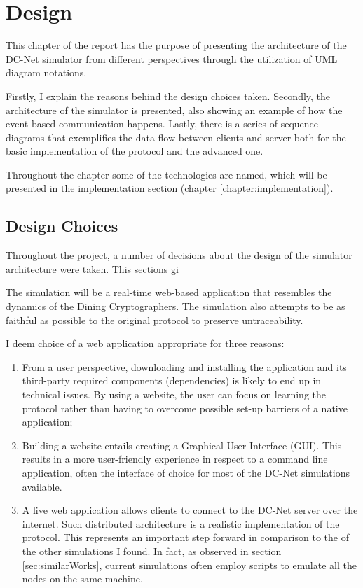 \chapter{Design} \label{chapter:design}
This chapter of the report has the purpose of presenting the architecture of the DC-Net simulator from different perspectives through the utilization of UML diagram notations.

Firstly, I explain the reasons behind the design choices taken. Secondly, the architecture of the simulator is presented, also showing an example of how the event-based communication happens. Lastly, there is a series of sequence diagrams that exemplifies the data flow between clients and server both for the basic implementation of the protocol and the advanced one. \newline

Throughout the chapter some of the technologies are named, which will be presented in the implementation section (chapter \ref{chapter:implementation}).


\section{Design Choices}
Throughout the project, a number of decisions about the design of the simulator architecture were taken. This sections gi

The simulation will be a real-time web-based application that resembles the dynamics of the Dining Cryptographers. The simulation also attempts to be as faithful as possible to the original protocol to preserve untraceability.


I deem choice of a web application appropriate for three reasons:
\begin{enumerate}
    \item From a user perspective, downloading and installing the application and its third-party required components (dependencies) is likely to end up in technical issues. By using a website, the user can focus on learning the protocol rather than having to overcome possible set-up barriers of a native application;
    \item Building a website entails creating a Graphical User Interface (GUI). This results in a more user-friendly experience in respect to a command line application, often the interface of choice for most of the DC-Net simulations available.
    \item A live web application allows clients to connect to the DC-Net server over the internet. Such distributed architecture is a realistic implementation of the protocol. This represents an important step forward in comparison to the of the other simulations I found. In fact, as observed in section \ref{sec:similarWorks}, current simulations often employ scripts to emulate all the nodes on the same machine.
\end{enumerate}

